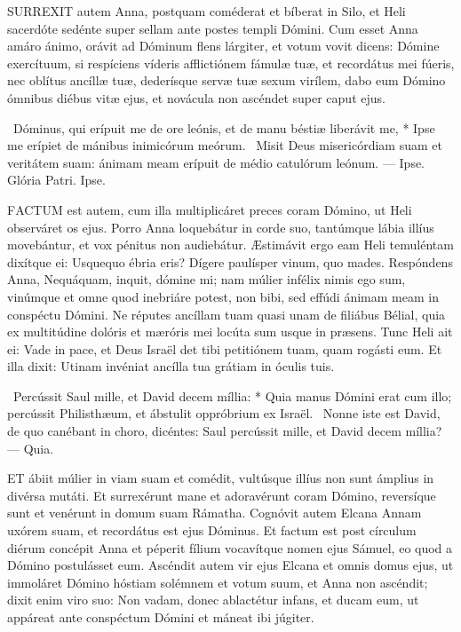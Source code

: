 

\lettrine[lines=2]{S}{URREXIT} autem Anna, postquam coméderat et bíberat in Silo, et Heli sacerdóte sedénte super sellam ante postes templi Dómini. Cum esset Anna amáro ánimo, orávit ad Dóminum flens lárgiter, et votum vovit dicens: Dómine exercítuum, si respíciens víderis afflictiónem fámulæ tuæ, et recordátus mei fúeris, nec oblítus ancíllæ tuæ, dederísque servæ tuæ sexum virílem, dabo eum Dómino ómnibus diébus vitæ ejus, et novácula non ascéndet super caput ejus.

\R\ Dóminus, qui erípuit me de ore leónis, et de manu béstiæ liberávit me, * Ipse me erípiet de mánibus inimicórum meórum. \V\ Misit Deus misericórdiam suam et veritátem suam: ánimam meam erípuit de médio catulórum leónum. --- Ipse. Glória Patri. Ipse.




\lettrine[lines=2]{F}{ACTUM} est autem, cum illa multiplicáret preces coram Dómino, ut Heli observáret os ejus. Porro Anna loquebátur in corde suo, tantúmque lábia illíus movebántur, et vox pénitus non audiebátur. Æstimávit ergo eam Heli temuléntam dixítque ei: Usquequo ébria eris? Dígere paulísper vinum, quo mades. Respóndens Anna, Nequáquam, inquit, dómine mi; nam múlier infélix nimis ego sum, vinúmque et omne quod inebriáre potest, non bibi, sed effúdi ánimam meam in conspéctu Dómini. Ne réputes ancíllam tuam quasi unam de filiábus Bélial, quia ex multitúdine dolóris et mæróris mei locúta sum usque in præsens. Tunc Heli ait ei: Vade in pace, et Deus Israël det tibi petitiónem tuam, quam rogásti eum. Et illa dixit: Utinam invéniat ancílla tua grátiam in óculis tuis.

\R\ Percússit Saul mille, et David decem míllia: * Quia manus Dómini erat cum illo; percússit Philisthæum, et ábstulit oppróbrium ex Israël. \V\ Nonne iste est David, de quo canébant in choro, dicéntes: Saul percússit mille, et David decem míllia? --- Quia.


\lettrine[lines=2]{E}{T} ábiit múlier in viam suam et comédit, vultúsque illíus non sunt ámplius in divérsa mutáti. Et surrexérunt mane et adoravérunt coram Dómino, reversíque sunt et venérunt in domum suam Rámatha. Cognóvit autem Elcana Annam uxórem suam, et recordátus est ejus Dóminus. Et factum est post círculum diérum concépit Anna et péperit fílium vocavítque nomen ejus Sámuel, eo quod a Dómino postulásset eum. Ascéndit autem vir ejus Elcana et omnis domus ejus, ut immoláret Dómino hóstiam solémnem et votum suum, et Anna non ascéndit; dixit enim viro suo: Non vadam, donec ablactétur infans, et ducam eum, ut appáreat ante conspéctum Dómini et máneat ibi júgiter.

